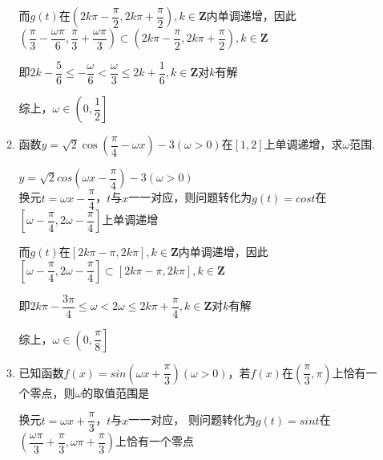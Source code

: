 \begin{enumerate}
\begin{enumerate}
\begin{jieda}
            而$g(t)$在$\left(2k\pi-\dfrac{\pi}{2}, 2k\pi+\dfrac{\pi}{2}\right), k \in \mathbf{Z}$内单调递增，因此$\left(\dfrac{\pi}{3}-\dfrac{\omega\pi}{6}, \dfrac{\pi}{3}+\dfrac{\omega\pi}{3}\right) \subset \left(2k\pi-\dfrac{\pi}{2}, 2k\pi+\dfrac{\pi}{2}\right), k \in \mathbf{Z}$

            即$2k-\dfrac{5}{6} \leq -\dfrac{\omega}{6} < \dfrac{\omega}{3} \leq 2k+\dfrac{1}{6}, k \in \mathbf{Z}$对$k$有解

            
            \begin{dingautolist}{172}
                \item $k < 0$时不成立
                \item $k = 0$时$\omega \in \left(0, \dfrac{1}{2}\right]$
                \item $k \geq 1$时不成立
            \end{dingautolist}

            综上，$\omega \in \left(0, \dfrac{1}{2}\right]$
        \end{jieda}
        \item 函数$y=\sqrt{2}\cos\left(\dfrac{\pi}{4}-\omega x\right)-3 (\omega > 0)$在$[1,2]$上单调递增，求$\omega$范围.
        \begin{jieda}
            $y = \sqrt{2}cos\left(\omega x - \dfrac{\pi}{4}\right)-3 (\omega > 0)$ \\

            换元$t = \omega x - \dfrac{\pi}{4}$，$t$与$x$一一对应，则问题转化为$g(t) = cost$在$\left[\omega-\dfrac{\pi}{4}, 2\omega-\dfrac{\pi}{4}\right]$上单调递增

            而$g(t)$在$\left[2k\pi-\pi, 2k\pi\right], k \in \mathbf{Z}$内单调递增，因此$\left[\omega-\dfrac{\pi}{4}, 2\omega-\dfrac{\pi}{4}\right] \subset \left[2k\pi-\pi, 2k\pi\right], k \in \mathbf{Z}$

            即$2k\pi-\dfrac{3\pi}{4} \leq \omega < 2\omega \leq 2k\pi+\dfrac{\pi}{4}, k \in \mathbf{Z}$对$k$有解
            
            \begin{dingautolist}{172}
                \item $k < 0$时不成立
                \item $k = 0$时$\omega \in \left(0, \dfrac{\pi}{8}\right]$
                \item $k \geq 1$时不成立
            \end{dingautolist}
            综上，$\omega \in \left(0, \dfrac{\pi}{8}\right]$
        \end{jieda}
        \item 已知函数$f(x) = sin\left(\omega x + \dfrac{\pi}{3}\right) (\omega > 0)$，若$f(x)$在$\left(\dfrac{\pi}{3}, \pi\right)$上恰有一个零点，则$\omega$的取值范围是\blkda[3]{$\left(\dfrac{2}{3}, \dfrac{5}{3}\right] \cup \left[2, \dfrac{8}{3}\right]$}
        \begin{jieda}
            换元$t = \omega x + \dfrac{\pi}{3}$，$t$与$x$一一对应，
            则问题转化为$g(t) = sint$在$\left(\dfrac{\omega \pi}{3} + \dfrac{\pi}{3}, \omega \pi + \dfrac{\pi}{3} \right)$上恰有一个零点 \\
            

\end{jieda}
\end{enumerate}
\end{enumerate}
